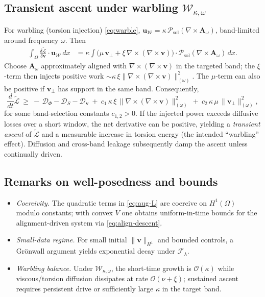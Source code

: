 \documentclass[a4paper,11pt]{article}
\begin{document}
\subsection{Transient ascent under warbling \texorpdfstring{$\mathcal W_{\kappa,\omega}$}{W}}
For warbling (torsion injection) \eqref{eq:warble},
$\mathbf u_{\mathcal W}=\kappa\,\mathcal P_{\mathrm{sol}}(\nabla\times \mathbf A_\omega)$,
band-limited around frequency $\omega$. Then
\begin{align}
\int_\Omega \frac{\delta\widetilde{\mathcal{L}}}{\delta \mathbf v}\cdot \mathbf u_{\mathcal W}\,dx
&=
\kappa \int \Big(\mu\,\mathbf v_\perp
+\xi\,\nabla\times(\nabla\times\mathbf v)\Big)\cdot
\mathcal P_{\mathrm{sol}}(\nabla\times \mathbf A_\omega)\,dx.
\label{eq:warble-work}
\end{align}
Choose $\mathbf A_\omega$ approximately aligned with
$\nabla\times(\nabla\times\mathbf v)$ in the targeted band; the $\xi$-term then
injects positive work $\sim \kappa\,\xi \|\nabla\times(\nabla\times\mathbf v)\|_{( \omega)}^2$.
The $\mu$-term can also be positive if $\mathbf v_\perp$ has support in the same
band. Consequently,
\begin{equation}
\frac{d}{dt}\widetilde{\mathcal{L}}
\ \ge\
-\,\mathcal{D}_\Phi - \mathcal{D}_S - \mathcal{D}_{\mathbf v}
\ +\ c_1\,\kappa\,\xi\,\|\nabla\times(\nabla\times\mathbf v)\|_{(\omega)}^2
\ +\ c_2\,\kappa\,\mu\,\|\mathbf v_\perp\|_{(\omega)}^2,
\label{eq:warble-ineq}
\end{equation}
for some band-selection constants $c_{1,2}>0$. If the injected power exceeds
diffusive losses over a short window, the net derivative can be positive,
yielding a \emph{transient ascent} of $\widetilde{\mathcal{L}}$ and a measurable
increase in torsion energy (the intended ``warbling'' effect). Diffusion and
cross-band leakage subsequently damp the ascent unless continually driven.

\subsection{Remarks on well-posedness and bounds}
\begin{itemize}
\item \emph{Coercivity.} The quadratic terms in \eqref{eq:aug-L} are coercive on
$H^1(\Omega)$ modulo constants; with convex $V$ one obtains uniform-in-time
bounds for the alignment-driven system via \eqref{eq:align-descent}.
\item \emph{Small-data regime.} For small initial $\|\mathbf v\|_{H^1}$ and bounded controls,
a Grönwall argument yields exponential decay under $\mathcal F_\lambda$.
\item \emph{Warbling balance.} Under $\mathcal W_{\kappa,\omega}$, the short-time growth
is $\mathcal O(\kappa)$ while viscous/torsion diffusion dissipates at rate
$\mathcal O(\nu+\xi)$; sustained ascent requires persistent drive or sufficiently
large $\kappa$ in the target band.
\end{itemize}
\end{document}
